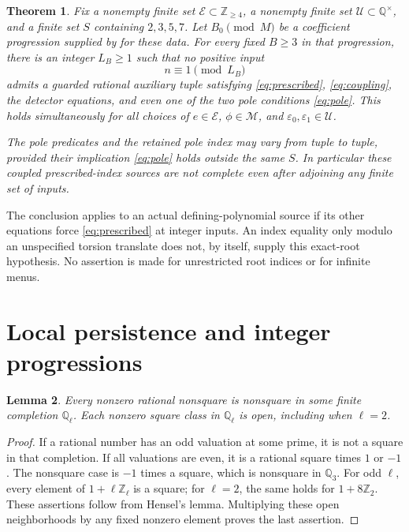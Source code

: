 \documentclass[11pt,a4paper]{article}
\newtheorem{theorem}{Theorem}[section]
\newtheorem{lemma}[theorem]{Lemma}
\newcommand{\Q}{\mathbb Q}\newcommand{\Z}{\mathbb Z}
\begin{document}
\begin{theorem}\label{thm:cofinite}
Fix a nonempty finite set $\mathcal E\subset\Z_{\ge4}$, a
nonempty finite set $\mathcal U\subset\Q^\times$, and a finite
set $S$ containing $2,3,5,7$. Let $B_0\pmod M$ be a coefficient
progression supplied by \cite[Theorem~1.1]{Mobius} for these data.
For every fixed $B\ge3$ in that progression, there is an integer
$L_B\ge1$ such that no positive input
\[
                            n\equiv1\pmod{L_B}
\]
admits a guarded rational auxiliary tuple satisfying
\eqref{eq:prescribed}, \eqref{eq:coupling}, the detector equations,
and even one of the two pole conditions \eqref{eq:pole}.
This holds simultaneously for all choices of
$e\in\mathcal E$, $\phi\in\mathcal M$, and
$\varepsilon_0,\varepsilon_1\in\mathcal U$.

The pole predicates and the retained pole index may vary from tuple
to tuple, provided their implication \eqref{eq:pole} holds outside
the same $S$. In particular these coupled prescribed-index sources
are not complete even after adjoining any finite set of inputs.
\end{theorem}

The conclusion applies to an actual defining-polynomial source if
its other equations force \eqref{eq:prescribed} at integer inputs.
An index equality only modulo an unspecified torsion translate does
not, by itself, supply this exact-root hypothesis. No assertion is
made for unrestricted root indices or for infinite menus.

\section{Local persistence and integer progressions}

\begin{lemma}\label{lem:squareclass}
Every nonzero rational nonsquare is nonsquare in some finite
completion $\Q_\ell$. Each nonzero square class in $\Q_\ell$
is open, including when $\ell=2$.
\end{lemma}
\begin{proof}
If a rational number has an odd valuation at some prime, it is
not a square in that completion. If all valuations are even,
it is a rational square times $1$ or $-1$. The nonsquare case
is $-1$ times a square, which is nonsquare in $\Q_3$.
For odd $\ell$, every element of $1+\ell\Z_\ell$ is a square;
for $\ell=2$, the same holds for $1+8\Z_2$. These assertions
follow from Hensel's lemma. Multiplying these open neighborhoods
by any fixed nonzero element proves the last assertion.
\end{proof}
\end{document}
